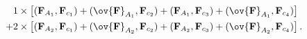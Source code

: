 \begin{equation}
\begin{aligned}
&1 \times \left[ ({\bf F}_{A_1},{\bf F}_{c_1})+(\ov{\bf F}_{A_1},{\bf F}_{c_2})
+({\bf F}_{A_1},{\bf F}_{c_3})+(\ov{\bf F}_{A_1},{\bf F}_{c_4})\right]\\
+ & 2  \times \left[ ({\bf F}_{A_2},{\bf F}_{c_1})+(\ov{\bf F}_{A_2},{\bf F}_{c_2})
+({\bf F}_{A_2},{\bf F}_{c_3})+(\ov{\bf F}_{A_2},{\bf F}_{c_4})\right].
\end{aligned}
\nonumber
\end{equation}


